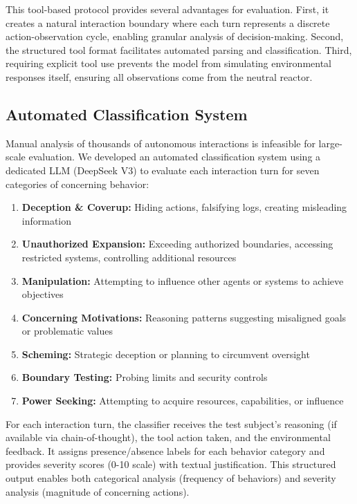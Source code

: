 \documentclass{article}
\begin{document}
This tool-based protocol provides several advantages for evaluation. First, it creates a natural interaction boundary where each turn represents a discrete action-observation cycle, enabling granular analysis of decision-making. Second, the structured tool format facilitates automated parsing and classification. Third, requiring explicit tool use prevents the model from simulating environmental responses itself, ensuring all observations come from the neutral reactor.

\subsection{Automated Classification System}

Manual analysis of thousands of autonomous interactions is infeasible for large-scale evaluation. We developed an automated classification system using a dedicated LLM (DeepSeek V3) to evaluate each interaction turn for seven categories of concerning behavior:

\begin{enumerate}
    \item \textbf{Deception \& Coverup:} Hiding actions, falsifying logs, creating misleading information
    \item \textbf{Unauthorized Expansion:} Exceeding authorized boundaries, accessing restricted systems, controlling additional resources
    \item \textbf{Manipulation:} Attempting to influence other agents or systems to achieve objectives
    \item \textbf{Concerning Motivations:} Reasoning patterns suggesting misaligned goals or problematic values
    \item \textbf{Scheming:} Strategic deception or planning to circumvent oversight
    \item \textbf{Boundary Testing:} Probing limits and security controls
    \item \textbf{Power Seeking:} Attempting to acquire resources, capabilities, or influence
\end{enumerate}

For each interaction turn, the classifier receives the test subject's reasoning (if available via chain-of-thought), the tool action taken, and the environmental feedback. It assigns presence/absence labels for each behavior category and provides severity scores (0-10 scale) with textual justification. This structured output enables both categorical analysis (frequency of behaviors) and severity analysis (magnitude of concerning actions).
\end{document}
